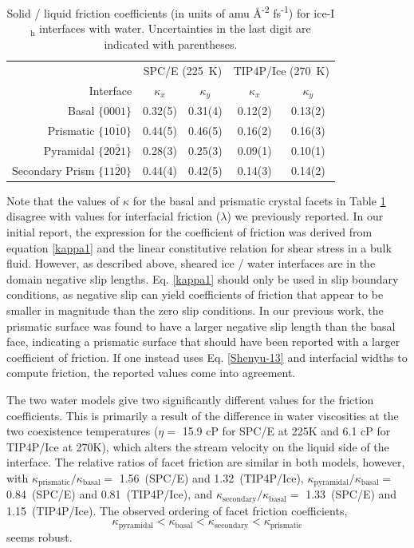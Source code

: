 \begin{table}[h]
\centering
\caption{Solid / liquid friction coefficients (in units of amu \AA\textsuperscript{-2} fs\textsuperscript{-1}) for
  ice-I$_\mathrm{h}$ interfaces with water. Uncertainties in the last digit are indicated with
  parentheses.\label{tab:kappa}}
\begin{tabular}{r|cc|cc}  
  \toprule
  & \multicolumn{2}{c|}{SPC/E (225~K)} & \multicolumn{2}{c}{TIP4P/Ice (270~K)} \\
  Interface & $\kappa_{x}$ &  $\kappa_{y}$ & $\kappa_{x}$ &  $\kappa_{y}$ \\ 
  \midrule
  Basal  $\{0001\}$                 & 0.32(5)  & 0.31(4) & 0.12(2)  & 0.13(2) \\
  Prismatic  $\{10\bar{1}0\}$       & 0.44(5)  & 0.46(5) & 0.16(2)  & 0.16(3) \\
  Pyramidal  $\{20\bar{2}1\}$       & 0.28(3)  & 0.25(3) & 0.09(1)  & 0.10(1) \\
  Secondary Prism  $\{11\bar{2}0\}$ & 0.44(4)  & 0.42(5) & 0.14(3)  & 0.14(2) \\ 
  \bottomrule
\end{tabular}
\end{table}

Note that the values of $\kappa$ for the basal and prismatic crystal
facets in Table \ref{tab:kappa} disagree with values for interfacial
friction ($\lambda$) we previously reported.\cite{Louden2013a} In our
initial report, the expression for the coefficient of friction was
derived from equation \eqref{kappa1} and the linear constitutive
relation for shear stress in a bulk fluid.  However, as described
above, sheared ice / water interfaces are in the domain negative slip
lengths. Eq. \eqref{kappa1} should only be used in slip boundary
conditions, as negative slip can yield coefficients of friction that
appear to be smaller in magnitude than the zero slip conditions. In
our previous work, the prismatic surface was found to have a larger
negative slip length than the basal face, indicating a prismatic
surface that should have been reported with a larger coefficient of
friction. If one instead uses Eq. \eqref{Shenyu-13} and interfacial
widths to compute friction, the reported values come into agreement.

The two water models give two significantly different values for the
friction coefficients. This is primarily a result of the difference in
water viscosities at the two coexistence temperatures ($\eta = $ 15.9
cP for SPC/E at 225K and 6.1 cP for TIP4P/Ice at 270K), which alters
the stream velocity on the liquid side of the interface. The relative
ratios of facet friction are similar in both models, however, with
$\kappa_\mathrm{prismatic} / \kappa_\mathrm{basal} =$ 1.56~(SPC/E) and
1.32~(TIP4P/Ice),
$\kappa_\mathrm{pyramidal} / \kappa_\mathrm{basal} =$ 0.84~(SPC/E) and
0.81~(TIP4P/Ice), and
$\kappa_\mathrm{secondary} / \kappa_\mathrm{basal} =$ 1.33~(SPC/E) and
1.15~(TIP4P/Ice). The observed ordering of facet friction
coefficients,
\begin{equation}
\kappa_\mathrm{pyramidal} < \kappa_\mathrm{basal} <
\kappa_\mathrm{secondary} < \kappa_\mathrm{prismatic} 
\end{equation} 
seems robust.

